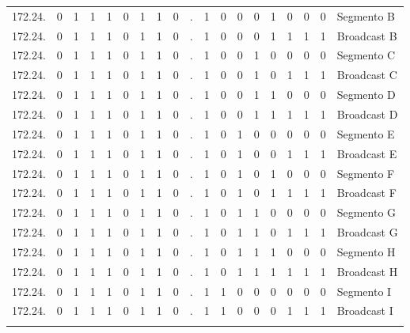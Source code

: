 \begin{center}
{\begin{tabular}{r cccccccc c cccccccc l}
172.24. & 0 & 1 & 1 & 1 & 0 & 1 & 1 & 0 & . & 1 & 0 & 0 & 0 & \multicolumn{1}{c|}{1} & 0 & 0 & 0 & Segmento B \\
172.24. & 0 & 1 & 1 & 1 & 0 & 1 & 1 & 0 & . & 1 & 0 & 0 & 0 & \multicolumn{1}{c|}{1} & 1 & 1 & 1 & Broadcast B \\
\addlinespace

172.24. & 0 & 1 & 1 & 1 & 0 & 1 & 1 & 0 & . & 1 & 0 & 0 & 1 & \multicolumn{1}{c|}{0} & 0 & 0 & 0 & Segmento C \\
172.24. & 0 & 1 & 1 & 1 & 0 & 1 & 1 & 0 & . & 1 & 0 & 0 & 1 & \multicolumn{1}{c|}{0} & 1 & 1 & 1 & Broadcast C \\
\addlinespace

172.24. & 0 & 1 & 1 & 1 & 0 & 1 & 1 & 0 & . & 1 & 0 & 0 & 1 & \multicolumn{1}{c|}{1} & 0 & 0 & 0 & Segmento D \\
172.24. & 0 & 1 & 1 & 1 & 0 & 1 & 1 & 0 & . & 1 & 0 & 0 & 1 & \multicolumn{1}{c|}{1} & 1 & 1 & 1 & Broadcast D \\
\addlinespace

172.24. & 0 & 1 & 1 & 1 & 0 & 1 & 1 & 0 & . & 1 & 0 & 1 & 0 & \multicolumn{1}{c|}{0} & 0 & 0 & 0 & Segmento E \\
172.24. & 0 & 1 & 1 & 1 & 0 & 1 & 1 & 0 & . & 1 & 0 & 1 & 0 & \multicolumn{1}{c|}{0} & 1 & 1 & 1 & Broadcast E \\
\addlinespace

172.24. & 0 & 1 & 1 & 1 & 0 & 1 & 1 & 0 & . & 1 & 0 & 1 & 0 & \multicolumn{1}{c|}{1} & 0 & 0 & 0 & Segmento F \\
172.24. & 0 & 1 & 1 & 1 & 0 & 1 & 1 & 0 & . & 1 & 0 & 1 & 0 & \multicolumn{1}{c|}{1} & 1 & 1 & 1 & Broadcast F \\
\addlinespace

172.24. & 0 & 1 & 1 & 1 & 0 & 1 & 1 & 0 & . & 1 & 0 & 1 & 1 & \multicolumn{1}{c|}{0} & 0 & 0 & 0 & Segmento G \\
172.24. & 0 & 1 & 1 & 1 & 0 & 1 & 1 & 0 & . & 1 & 0 & 1 & 1 & \multicolumn{1}{c|}{0} & 1 & 1 & 1 & Broadcast G \\
\addlinespace

172.24. & 0 & 1 & 1 & 1 & 0 & 1 & 1 & 0 & . & 1 & 0 & 1 & 1 & \multicolumn{1}{c|}{1} & 0 & 0 & 0 & Segmento H \\
172.24. & 0 & 1 & 1 & 1 & 0 & 1 & 1 & 0 & . & 1 & 0 & 1 & 1 & \multicolumn{1}{c|}{1} & 1 & 1 & 1 & Broadcast H \\
\addlinespace

172.24. & 0 & 1 & 1 & 1 & 0 & 1 & 1 & 0 & . & 1 & 1 & 0 & 0 & \multicolumn{1}{c|}{0} & 0 & 0 & 0 & Segmento I \\
172.24. & 0 & 1 & 1 & 1 & 0 & 1 & 1 & 0 & . & 1 & 1 & 0 & 0 & \multicolumn{1}{c|}{0} & 1 & 1 & 1 & Broadcast I \\
\addlinespace


\end{tabular}}
\end{center}
